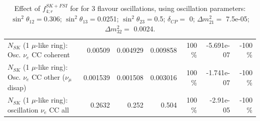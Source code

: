 \begin{table}
\begin{tabular}{| l | r | r | r  r | r  r |}
                          $N_{SK}$ (1 $\mu$-like ring): Osc. $\nu_e$ CC coherent &         0.00509 &        0.004929 &        0.009858 &      100 \%  &      -5.691e-07 &     -100 \%  \\ 
           $N_{SK}$ (1 $\mu$-like ring): Osc. $\nu_e$ CC other ($\nu_\mu$ disap) &        0.001539 &        0.001508 &        0.003016 &      100 \%  &      -1.741e-07 &     -100 \%  \\ 
                        $N_{SK}$ (1 $\mu$-like ring): oscillation $\nu_e$ CC all &          0.2632 &           0.252 &           0.504 &      100 \%  &       -2.91e-05 &     -100 \%  \\ 
\hline
\hline
\end{tabular}
\caption{ Effect of $f_{4; r}^{SK+FSI}$ for for 3 flavour oscillations, using oscillation parameters:  $\sin^2\theta_{12} = $0.306; $\sin^2\theta_{13} = $0.0251; $\sin^2\theta_{23} = $0.5; $\delta_{CP} = $        0; $\Delta m^2_{21} = $    7.5e-05; $\Delta m^2_{32} = $    0.0024. }
\label{tab:num_skdetfsi_004_1RmuT_3f_osc_t13:0.0251_spectralreco_spectraltrue}
\end{table}
\clearpage

